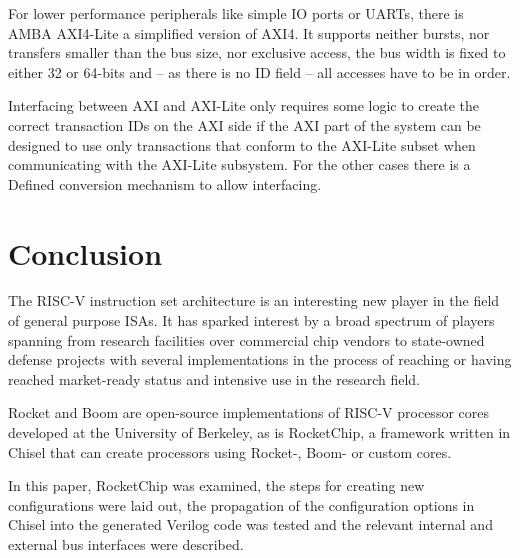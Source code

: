 \documentclass[journal,a4paper]{IEEEtran}
\begin{document}
For lower performance peripherals like simple IO ports or UARTs, there is AMBA AXI4-Lite\cite[B1]{axi} a simplified version of AXI4.
It supports neither bursts, nor transfers smaller than the bus size, nor exclusive access, the bus width is fixed to either 32 or 64-bits and -- as there is no ID field -- all accesses have to be in order.

Interfacing between AXI and AXI-Lite only requires some logic to create the correct transaction IDs on the AXI side if the AXI part of the system can be designed to use only transactions that conform to the AXI-Lite subset when communicating with the AXI-Lite subsystem.
For the other cases there is a Defined conversion mechanism\cite[B1.3]{axi} to allow interfacing.




\section{Conclusion}
The RISC-V instruction set architecture is an interesting new player in the field of general purpose ISAs.
It has sparked interest by a broad spectrum of players spanning from research facilities over commercial chip vendors to state-owned defense projects with several implementations in the process of reaching or having reached market-ready status and intensive use in the research field.

Rocket and Boom are open-source implementations of RISC-V processor cores developed at the University of Berkeley, as is RocketChip, a framework written in Chisel that can create processors using Rocket-, Boom- or custom cores.

In this paper, RocketChip was examined, the steps for creating new configurations were laid out, the propagation of the configuration options in Chisel into the generated Verilog code was tested and the relevant internal and external bus interfaces were described.

\end{document}

